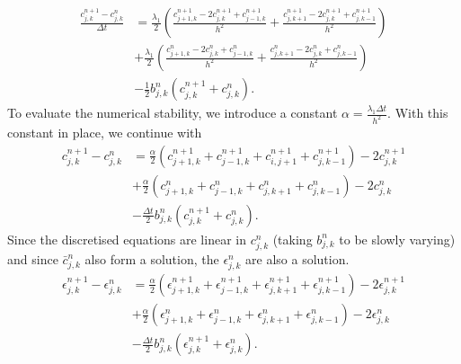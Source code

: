 \begin{equation*}
    \begin{split}
        \frac{c_{j,k}^{n+1} - c_{j,k}^{n}}{\Delta t} &=
        \frac{\lambda_1}{2}  \left( \frac{c_{j+1,k}^{n+1} - 2 c_{j,k}^{n+1} + c_{j-1,k}^{n+1} }{h^2} + 
                                    \frac{c_{j,k+1}^{n+1} - 2 c_{j,k}^{n+1} + c_{j,k-1}^{n+1} }{h^2} \right)  \\
                                   & +\frac{\lambda_1}{2} \left( \frac{c_{j+1,k}^{n} - 2 c_{j,k}^{n} + c_{j-1,k}^{n} }{h^2} + 
                                    \frac{c_{j,k+1}^{n} - 2 c_{j,k}^{n} + c_{j,k-1}^{n} }{h^2} \right) \\
                                   &-\frac{1}{2} b_{j,k}^{n} (c_{j,k}^{n+1} + c_{j,k}^{n}).
    \end{split}
\end{equation*}
To evaluate the numerical stability, we introduce a constant $\alpha = \frac{ \lambda_1 \Delta t }{h^2}$.
With this constant in place, we continue with
\begin{equation*}
    \begin{split}
        c_{j,k}^{n+1} - c_{j,k}^{n} &=
       \frac{\alpha}{2}  \left( c_{j+1,k}^{n+1} + c_{j-1,k}^{n+1} + 
                       c_{i,j+1}^{n+1} + c_{j,k-1}^{n+1}  \right) - 2 c_{j,k}^{n+1}  \\
                                   & +\frac{\alpha}{2} \left( c_{j+1,k}^{n}+ c_{j-1,k}^{n} + 
                                    c_{j,k+1}^{n} + c_{j,k-1}^{n}  \right) - 2 c_{j,k}^{n} \\
                                   &-\frac{\Delta t}{2} b_{j,k}^{n} (c_{j,k}^{n+1} + c_{j,k}^{n}).
    \end{split}
\end{equation*}
Since the discretised equations are linear in $c_{j,k}^{n}$ (taking $b_{j,k}^{n}$ to be slowly varying)
and since $\bar{c}_{j,k}^n$ also form a solution, the $\epsilon_{j,k}^n$ are also 
a solution.
\begin{equation*}
    \begin{split}
        \epsilon_{j,k}^{n+1} - \epsilon_{j,k}^{n} &=
       \frac{\alpha}{2}  \left( \epsilon_{j+1,k}^{n+1} + \epsilon_{j-1,k}^{n+1} + 
                                \epsilon_{j,k+1}^{n+1} + \epsilon_{j,k-1}^{n+1}  \right) - 2 \epsilon_{j,k}^{n+1}  \\
                                   & +\frac{\alpha}{2} \left( \epsilon_{j+1,k}^{n}+ \epsilon_{j-1,k}^{n} + 
                                   \epsilon_{j,k+1}^{n} + \epsilon_{j,k-1}^{n}  \right) - 2 \epsilon_{j,k}^{n} \\
                                   &-\frac{\Delta t}{2} b_{j,k}^{n} (\epsilon_{j,k}^{n+1} + \epsilon_{j,k}^{n}).
    \end{split}
\end{equation*}
